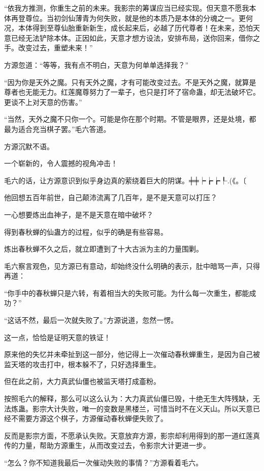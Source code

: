 \begin{this_body}
“依我方推测，你重生之前的未来。我影宗的筹谋应当已经实现。但天意不愿我本体再登尊位。当初剑仙薄青为何失败，就是他的本质乃是本体的分魂之一。更何况，本体得到至尊仙胎重新新生，成长起来后，必越了历代尊者！在未来，恐怕天意已经无法铲除本体。正因如此，天意才想方设法，安排布局，送你回来，借你之手。改变过去，重塑未来！”

方源忽道：“等等，我有点不明白，天意为何单单选择我？”

“因为你是天外之魔。只有天外之魔，才有可能改变过去。不是天外之魔，就算是尊者也无能无力。红莲魔尊努力了一辈子，也只是打坏了宿命蛊，却无法破坏它。更谈不上对天意的伤害。”

“当然，天外之魔不只你一个。可能是你在那个时期。不管是眼界，还是处境，都最为适合充当棋子罢。”毛六答道。

方源沉默不语。

一个崭新的，令人震撼的视角冲击！

毛六的话，让方源意识到似乎身边真的萦绕着巨大的阴谋。╪╪┝┢┢┞.(《。〔

他回想五百年前世，自己颠沛流离了几百年，是不是天意可以打压？

一心想要炼出血神子，是不是天意在暗中破坏？

得到春秋蝉的仙蛊方的过程，似乎的确是有些容易。

炼出春秋蝉不久之后，就立即遭到了十大古派为主的力量围剿。

毛六察言观色，见方源已有意动，却始终没什么明确的表示，肚中暗骂一声，只得再道：

“你手中的春秋蝉只是六转，有着相当大的失败可能。为什么每一次重生，都能成功？”

“这话不然，最后一次就失败了。”方源说道，忽然一愣。

这一点，恰恰是证明天意的铁证！

原来他的失忆并未牵扯到这一部分，他记得上一次催动春秋蝉重生，是因为自己被监天塔的攻击打中，根本躲不了，只好选择重生。

但在此之前，大力真武仙僵也被监天塔打成齑粉。

按照毛六的解释，那么可以这么认为：大力真武仙僵已毁，十绝无生大阵残缺，无法炼蛊。影宗大计失败，唯一的变数是黑楼兰，可惜当时不在义天山。所以天意已经不需要方源这个棋子，方源催动春秋蝉便失败了。

反而是影宗方面，不愿承认失败。天意放弃方源，影宗却利用得到的那一道红莲真传的力量，帮助方源重生，从而改变过去，令影宗大计更进一步。

“怎么？你不知道我最后一次催动失败的事情？”方源看着毛六。


\end{this_body}
